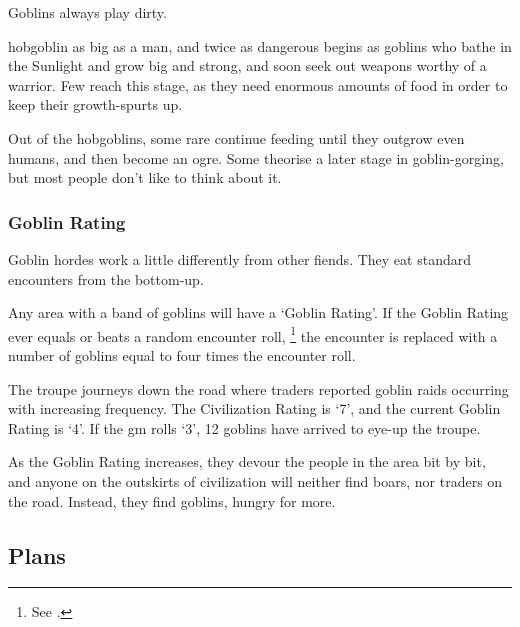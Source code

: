 \begin{multicols}{2}
Goblins always play dirty.


  {hobgoblin}%
  {as big as a man, and twice as dangerous}%
begins as goblins who bathe in the Sunlight and grow big and strong, and soon seek out weapons worthy of a warrior.
Few reach this stage, as they need enormous amounts of food in order to keep their growth-spurts up.

Out of the hobgoblins, some rare continue feeding until they outgrow even humans, and then become an ogre.
Some theorise a later stage in goblin-gorging, but most people don't like to think about it.


\subsubsection{Goblin Rating}
\label{goblin_rating}

Goblin hordes work a little differently from other fiends.
They eat standard encounters from the bottom-up.

Any area with a band of goblins will have a `Goblin Rating'.
If the Goblin Rating ever equals or beats a random encounter roll,%
\footnote{See .}
the encounter is replaced with a number of goblins equal to four times the encounter roll.

\begin{exampletext}
  The troupe journeys down the road where traders reported goblin raids occurring with increasing frequency.
  The Civilization Rating is `7', and the current Goblin Rating is `4'.
  If the \gls{gm} rolls `3', 12 goblins have arrived to eye-up the troupe.
\end{exampletext}

\exampleGoblinEnc

As the Goblin Rating increases, they devour the people in the area bit by bit, and anyone on the outskirts of civilization will neither find boars, nor traders on the road.
Instead, they find goblins, hungry for more.



\subsection{Plans}


\end{multicols}
